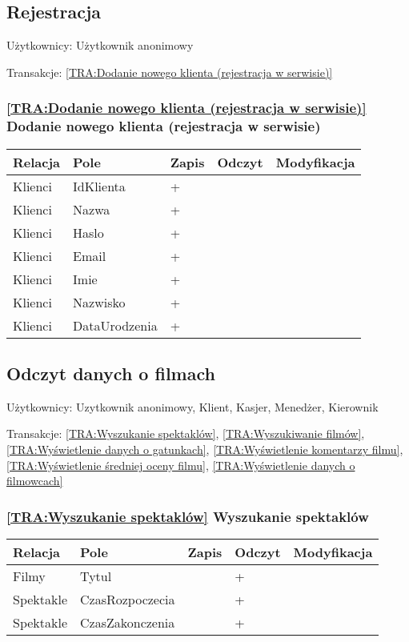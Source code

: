 \subsection{Rejestracja}
Użytkownicy: Użytkownik anonimowy

Transakcje: \ref{TRA:Dodanie nowego klienta (rejestracja w serwisie)}
\subsubsection*{\ref{TRA:Dodanie nowego klienta (rejestracja w serwisie)} Dodanie nowego klienta (rejestracja w serwisie)}
\begin{tabularx}{\textwidth}{|Y|Y|Y|Y|Y|}\hline
Relacja & Pole & Zapis & Odczyt & Modyfikacja \\\hline
Klienci & IdKlienta & + &  & \\
Klienci & Nazwa & + &  & \\
Klienci & Haslo & + &  & \\
Klienci & Email & + &  & \\
Klienci & Imie & + &  & \\
Klienci & Nazwisko & + &  & \\
Klienci & DataUrodzenia & + &  & \\
\hline\end{tabularx}
\subsection{Odczyt danych o filmach}
Użytkownicy: Uzytkownik anonimowy, Klient, Kasjer, Menedżer, Kierownik

Transakcje: \ref{TRA:Wyszukanie spektaklów}, \ref{TRA:Wyszukiwanie filmów}, \ref{TRA:Wyświetlenie danych o gatunkach}, \ref{TRA:Wyświetlenie komentarzy filmu}, \ref{TRA:Wyświetlenie średniej oceny filmu}, \ref{TRA:Wyświetlenie danych o filmowcach}
\subsubsection*{\ref{TRA:Wyszukanie spektaklów} Wyszukanie spektaklów}
\begin{tabularx}{\textwidth}{|Y|Y|Y|Y|Y|}\hline
Relacja & Pole & Zapis & Odczyt & Modyfikacja \\\hline
Filmy & Tytul &  & + & \\
Spektakle & CzasRozpoczecia &  & + & \\
Spektakle & CzasZakonczenia &  & + & \\
\hline\end{tabularx}
